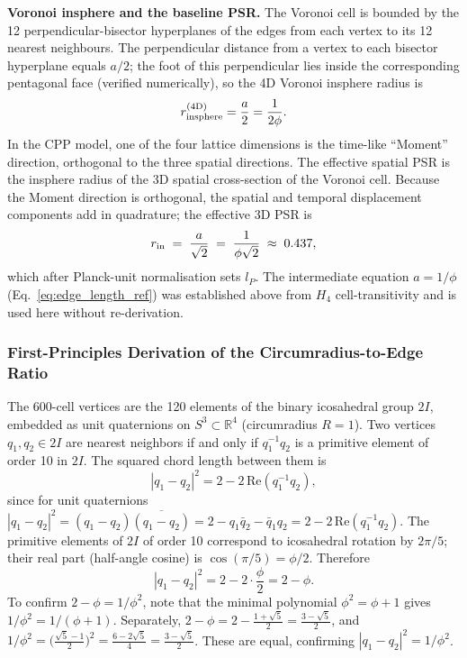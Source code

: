 \documentclass[11pt,letterpaper]{article}
\begin{document}
\textbf{Voronoi insphere and the baseline PSR.}
The Voronoi cell is bounded by the 12 perpendicular-bisector hyperplanes
of the edges from each vertex to its 12 nearest neighbours.
The perpendicular distance from a vertex to each bisector hyperplane
equals $a/2$; the foot of this perpendicular lies inside the
corresponding pentagonal face (verified numerically), so the
4D Voronoi insphere radius is
\begin{equation}
  r_{\rm insphere}^{\rm (4D)} = \frac{a}{2} = \frac{1}{2\phi}.
  \label{eq:voronoi_insphere}
\end{equation}
In the CPP model, one of the four lattice dimensions is the
time-like ``Moment'' direction, orthogonal to the three spatial
directions. The effective spatial PSR is the insphere radius
of the 3D spatial cross-section of the Voronoi cell. Because the
Moment direction is orthogonal, the spatial and temporal displacement
components add in quadrature; the effective 3D PSR is
\begin{equation}
  r_{\rm in} \;=\; \frac{a}{\sqrt{2}}
           \;=\; \frac{1}{\phi\sqrt{2}} \;\approx\; 0.437,
  \label{eq:r_in_derived}
\end{equation}
which after Planck-unit normalisation sets $l_P$. The intermediate
equation $a = 1/\phi$ (Eq.~\ref{eq:edge_length_ref}) was established
above from $H_4$ cell-transitivity and is used here without
re-derivation.

\subsubsection{First-Principles Derivation of the Circumradius-to-Edge Ratio}

The 600-cell vertices are the 120 elements of the binary icosahedral 
group $2I$, embedded as unit quaternions on $S^3 \subset \mathbb{R}^4$ 
(circumradius $R = 1$). Two vertices $q_1, q_2 \in 2I$ are 
nearest neighbors if and only if $q_1^{-1}q_2$ is a primitive element 
of order 10 in $2I$. The squared chord length between them is
\[
|q_1 - q_2|^2 = 2 - 2\,\mathrm{Re}(q_1^{-1}q_2),
\]
since for unit quaternions $|q_1-q_2|^2 = (q_1-q_2)\overline{(q_1-q_2)} 
= 2 - q_1\bar{q}_2 - \bar{q}_1 q_2 = 2 - 2\,\mathrm{Re}(q_1^{-1}q_2)$.
The primitive elements of $2I$ of order 10 correspond to icosahedral 
rotation by $2\pi/5$; their real part (half-angle cosine) is 
$\cos(\pi/5) = \phi/2$. Therefore
\[
|q_1 - q_2|^2 = 2 - 2\cdot\frac{\phi}{2} = 2 - \phi.
\]
To confirm $2-\phi = 1/\phi^2$, note that the minimal polynomial 
$\phi^2 = \phi + 1$ gives $1/\phi^2 = 1/(\phi+1)$. Separately, 
$2 - \phi = 2 - \tfrac{1+\sqrt{5}}{2} = \tfrac{3-\sqrt{5}}{2}$, 
and $1/\phi^2 = \bigl(\tfrac{\sqrt{5}-1}{2}\bigr)^2 
= \tfrac{6-2\sqrt{5}}{4} = \tfrac{3-\sqrt{5}}{2}$. 
These are equal, confirming $|q_1-q_2|^2 = 1/\phi^2$.
\end{document}
